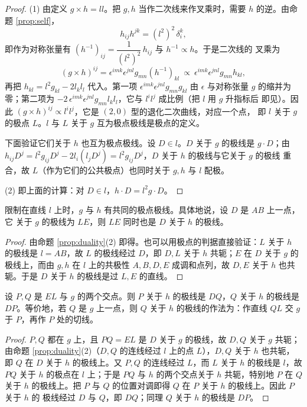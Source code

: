 \begin{proof}
(1) 由定义 $g\times h=ll$。把 $g,h$ 当作二次线来作叉乘时，需要 $h$ 的逆。由命题 \ref{prop:self}，
\[
h_{ij}h^{jk}=(l^2)^2\,\delta^k_i ,
\]
即作为对称张量有 $(h^{-1})_{ij}=\dfrac{1}{(l^2)^2}\,h_{ij}$ 与 $h^{-1}\propto h$。于是二次线的
叉乘为
\[
(g\times h)^{ij}=\epsilon^{imk}\epsilon^{jnl}g_{mn}(h^{-1})_{kl}
\ \propto\ \epsilon^{imk}\epsilon^{jnl}g_{mn}h_{kl},
\]
再把 $h_{kl}=l^2g_{kl}-2l_kl_l$ 代入。第一项 $\epsilon^{imk}\epsilon^{jnl}g_{mn}g_{kl}$ 由
$\epsilon$ 与对称张量 $g$ 的缩并为零；第二项为
$-2\,\epsilon^{imk}\epsilon^{jnl}g_{mn}l_k l_l$，它与 $l^il^j$ 成比例（把 $l$ 用 $g$ 升指标后
即见）。因此 $(g\times h)^{ij}\propto l^il^j$，它是 $(2,0)$ 型的退化二次曲线，对应一个点，
即 $l$ 关于 $g$ 的极点 $L$。$l$ 与 $L$ 关于 $g$ 互为极点极线是极点的定义。

下面验证它们关于 $h$ 也互为极点极线。设 $D\in l$。$D$ 关于 $g$ 的极线是 $g\cdot D$；由
$h_{ij}D^j=l^2g_{ij}D^j-2l_i(l_jD^j)=l^2g_{ij}D^j$，$D$ 关于 $h$ 的极线与它关于 $g$ 的极线
重合，故 $L$（作为它们的公共极点）也同时关于 $g,h$ 与 $l$ 配极。

(2) 即上面的计算：对 $D\in l$，$h\cdot D=l^2g\cdot D$。
\end{proof}

\begin{proposition}
\label{prop:common-polar-on-l}
限制在直线 $l$ 上时，$g$ 与 $h$ 有共同的极点极线。具体地说，设 $D$ 是 $AB$ 上一点，它
关于 $g$ 的极线为 $LE$，则 $LE$ 同时也是 $D$ 关于 $h$ 的极线。
\end{proposition}

\begin{proof}
由命题 \ref{prop:duality}(2) 即得。也可以用极点的判据直接验证：$L$ 关于 $h$ 的极线是
$l=AB$，故 $L$ 的极线经过 $D$，即 $D,L$ 关于 $h$ 共轭；$E$ 在 $D$ 关于 $g$ 的极线上，而由
$g,h$ 在 $l$ 上的共极性 $A,B,D,E$ 成调和点列，故 $D,E$ 关于 $h$ 也共轭。于是 $D$ 关于 $h$
的极线是过 $L,E$ 的直线。
\end{proof}

\begin{proposition}
\label{prop:PQDP}
设 $P,Q$ 是 $EL$ 与 $g$ 的两个交点。则 $P$ 关于 $h$ 的极线是 $DQ$，$Q$ 关于 $h$ 的极线是
$DP$。等价地，若 $Q$ 是 $g$ 上一点，则 $Q$ 关于 $h$ 的极线的作法为：作直线 $QL$ 交 $g$ 于
$P$，再作 $P$ 处的切线。
\end{proposition}

\begin{proof}
$P,Q$ 都在 $g$ 上，且 $PQ=EL$ 是 $D$ 关于 $g$ 的极线，故 $D,Q$ 关于 $g$ 共轭；由命题
\ref{prop:duality}(2)（$D,Q$ 的连线经过 $l$ 上的点 $L$），$D,Q$ 关于 $h$ 也共轭，即 $Q$ 在
$D$ 关于 $h$ 的极线上。又 $P,Q$ 的连线经过 $L$，而 $L$ 关于 $h$ 的极线是 $l$，故 $PQ$ 关于
$h$ 的极点在 $l$ 上；于是 $PQ$ 与 $h$ 的两个交点关于 $h$ 共轭，特别地 $P$ 在 $Q$ 关于 $h$
的极线上。把 $P$ 与 $Q$ 的位置对调即得 $Q$ 在 $P$ 关于 $h$ 的极线上。因此 $P$ 关于 $h$ 的
极线经过 $D$ 与 $Q$，即 $DQ$；同理 $Q$ 关于 $h$ 的极线是 $DP$。
\end{proof}

